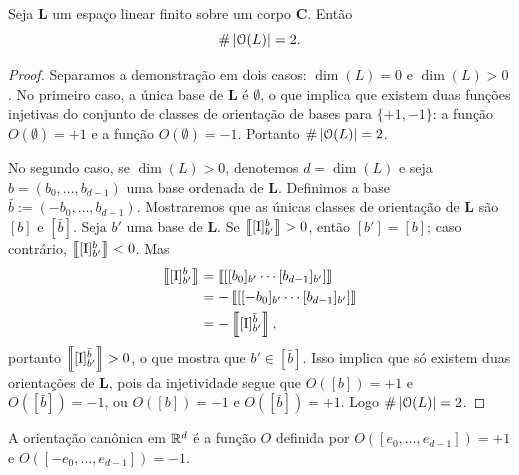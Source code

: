 \begin{proposition}
Seja $\bm L$ um espaço linear finito sobre um corpo $\bm C$. Então
	\begin{equation*}
	\#\left\lvert{\mathcal{O}(L)}\right\rvert = 2.
	\end{equation*}
\end{proposition}
\begin{proof}
Separamos a demonstração em dois casos: $\dim(L)=0$ e $\dim(L)>0$. No primeiro caso, a única base de $\bm L$ é $\emptyset$, o que implica que existem duas funções injetivas do conjunto de classes de orientação de bases para $\{+1,-1\}$: a função $O(\emptyset) = +1$ e a função $O(\emptyset) = -1$. Portanto $\#\left\lvert{\mathcal{O}(L)}\right\rvert=2$.

No segundo caso, se $\dim(L)>0$, denotemos $d = \dim(L)$ e seja $b = (b_0,\ldots,b_{d-1})$ uma base ordenada de $\bm L$. Definimos a base $\bar b := (-b_0,\ldots,b_{d-1})$. Mostraremos que as únicas classes de orientação de $\bm L$ são $[b]$ e $[\bar b]$. Seja $b'$ uma base de $\bm L$. Se $\left\llbracket{[\mathrm{I}]^b_{b'}}\right\rrbracket > 0$, então $[b'] = [b]$; caso contrário, $\left\llbracket{[\mathrm{I}]^b_{b'}}\right\rrbracket < 0$. Mas
	\begin{align*}
	\left\llbracket{[\mathrm{I}]^b_{b'}}\right\rrbracket &= \left\llbracket{[[b_0]_{b'} \cdots [b_{d-1}]_{b'}]}\right\rrbracket \\
	&=	- \left\llbracket{[[-b_0]_{b'} \cdots [b_{d-1}]_{b'}]}\right\rrbracket \\
	&= -\left\llbracket{[\mathrm{I}]^{\bar b}_{b'}}\right\rrbracket,
	\end{align*}
portanto $\left\llbracket{[\mathrm{I}]^{\bar b}_{b'}}\right\rrbracket > 0$, o que mostra que $b' \in [\bar b]$. Isso implica que só existem duas orientações de $\bm L$, pois da injetividade segue que $O([b])=+1$ e $O([\bar b])=-1$, ou $O([b])=-1$ e $O([\bar b])=+1$. Logo $\#\left\lvert{\mathcal{O}(L)}\right\rvert=2$.
\end{proof}

A orientação canônica em $\mathbb{R}^d$ é a função $O$ definida por $O([e_0,\ldots,e_{d-1}]) = +1$ e $O([-e_0,\ldots,e_{d-1}]) = -1$.


